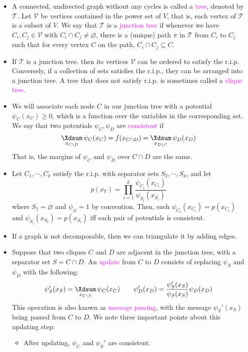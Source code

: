 \documentclass[UTF8]{book}
\DeclareMathOperator*{\Xsum}{\mathchoice{\Xdsum}{\Xtsum}{\Xtsum}{\Xtsum}}
\newcommand{\concept}[1]{\textcolor{magenta}{#1}}
\begin{document}
\begin{itemize}
\item A connected, undirected graph without any cycles is called a \concept{tree}, denoted by $\mathcal{T}$. Let $\mathcal{V}$ be vertices contained in the power set of $V$, that is, each vertex of $\mathcal{T}$ is a subset of $V$. We say that $\mathcal{T}$ is a \concept{junction tree} if whenever we have $C_i,C_j\in \mathcal{V}$ with $C_i\cap C_j\neq\varnothing$, there is a (unique) path $\pi$ in $\mathcal{T}$ from $C_i$ to $C_j$ such that for every vertex $C$ on the path, $C_i\cap C_j\subseteq C$.
\item If $\mathcal{T}$ is a junction tree. then its vertices $\mathcal{V}$ can be ordered to satisfy the r.i.p. Conversely, if a collection of sets satisfies the r.i.p., they can be arranged into a junction tree. A tree that does not satisfy r.i.p. is sometimes called a \concept{clique tree}.
\item We will associate each node $C$ in our junction tree with a potential $\psi_C(x_C)\geq 0$, which is a function over the variables in the corresponding set. We say that two potentials $\psi_C,\psi_D$ are \concept{consistent} if 
$$
\Xsum_{x_{C\setminus D}}\psi_C(x_C) = f(x_{C\cap D}) = \Xsum_{x_{D\setminus C}}\psi_D(x_D)
$$
That is, the margins of $\psi_C$ and $\psi_D$ over $C\cap D$ are the same.
\item Let $C_1,\cdots,C_k$ satisfy the r.i.p. with separator sets $S_2,\cdots,S_k$, and let
$$
p(x_V) = \prod_{i=1}^k\dfrac{\psi_{C_i}(x_{C_i})}{\psi_{S_i}(x_{S_i})}
$$
where $S_1=\varnothing$ and $\psi_\varnothing = 1$ by convention. Then, each $\psi_{C_i}(x_{C_i})=p(x_{C_i})$ and $\psi_{S_i}(x_{S_i}) = p(x_{S_i})$ iff each pair of potentials is consistent.
\item If a graph is not decomposable, then we can triangulate it by adding edges.
\item Suppose that two cliques $C$ and $D$ are adjacent in the junction tree, with a separator set $S=C\cap D$. An \concept{update} from $C$ to $D$ consists of replacing $\psi_S$ and $\psi_D$ with the following:
$$
\psi_S'(x_S) = \Xsum_{x_{C\setminus S}}\psi_C(x_C) \qquad \psi_D'(x_D) = \dfrac{\psi_S'(x_S)}{\psi_S(x_S)}\psi_D(x_D)
$$
This operation is also known as \concept{message passing}, with the message $\psi_S'(x_S)$ being passed from $C$ to $D$. We note three important points about this updating step:
\begin{itemize}
	\item After updating, $\psi_C$ and $\psi_S'$ are consistent.

\end{itemize}
\end{itemize}
\end{document}

